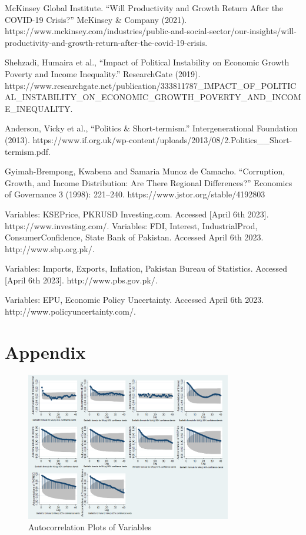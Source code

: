 \documentclass[11pt]{article}
\begin{document}
McKinsey Global Institute. “Will Productivity and Growth Return After the COVID-19 Crisis?” McKinsey \& Company (2021). https://www.mckinsey.com/industries/public-and-social-sector/our-insights/will-productivity-and-growth-return-after-the-covid-19-crisis. \newline

Shehzadi, Humaira et al., “Impact of Political Instability on Economic Growth Poverty and Income Inequality.” ResearchGate (2019). \newline https://www.researchgate.net/publication/333811787\_IMPACT\_OF\newline\_POLITICAL\_INSTABILITY\_ON\_ECONOMIC\_GROWTH\_POVERTY\_AND\_INCOME\_INEQUALITY. \newline

Anderson, Vicky et al., “Politics \& Short-termism.” Intergenerational Foundation (2013). \newline https://www.if.org.uk/wp-content/uploads/2013/08/2.Politics\_\_Short-termism.pdf. \newline

Gyimah-Brempong, Kwabena and Samaria Munoz de Camacho. “Corruption, Growth, and Income Distribution: Are There Regional Differences?” Economics of Governance 3 (1998): 221–240. https://www.jstor.org/stable/4192803 \newline

Variables: KSEPrice, PKRUSD Investing.com. Accessed [April 6th 2023]. https://www.investing.com/.
Variables: FDI, Interest, IndustrialProd, ConsumerConfidence, State Bank of Pakistan. Accessed April 6th 2023. http://www.sbp.org.pk/. \newline

Variables: Imports, Exports, Inflation, Pakistan Bureau of Statistics. Accessed [April 6th 2023]. http://www.pbs.gov.pk/. \newline

Variables: EPU, Economic Policy Uncertainty. Accessed April 6th 2023. http://www.policyuncertainty.com/.

\section{Appendix}

\begin{figure}[h]
    \centering
    \includegraphics[width=0.8\textwidth]{images/Figure1a.png}
    \caption{Autocorrelation Plots of Variables}
\end{figure}
\end{document}
